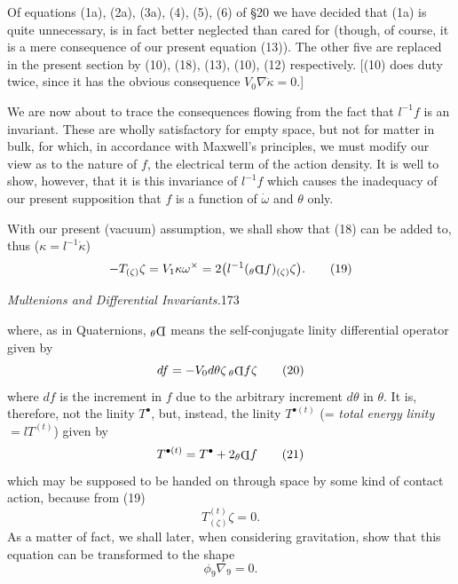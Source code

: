 \documentclass[11pt]{article}
\newcommand{\invd}{\mathord{\vcenter{\hbox{\rotatebox[origin=c]{180}{\(\mathrm{D}\)}}}}}
\newcommand{\thetaPi}{{}_\theta\invd}
\begin{document}
\indent Of equations (1a), (2a), (3a), (4), (5), (6) of §20 we have decided that (1a) is quite unnecessary, is in fact better neglected than cared for (though, of course, it is a mere consequence of our present equation (13)). The other five are replaced in the present section by (10), (18), (13), (10), (12) respectively. [(10) does duty twice, since it has the obvious consequence $V_0\nabla\dot\kappa=0$.]

\indent We are now about to trace the consequences flowing from the fact that $l^{-1}f$ is an invariant. These are wholly satisfactory for empty space, but not for matter in bulk, for which, in accordance with Maxwell's principles, we must modify our view as to the nature of $f$, the electrical term of the action density. It is well to show, however, that it is this invariance of $l^{-1}f$ which causes the inadequacy of our present supposition that $f$ is a function of $\dot\omega$ and $\theta$ only.

\indent With our present (vacuum) assumption, we shall show that (18) can be added to, thus ($\kappa=l^{-1}\dot\kappa$)
\begin{equation}
  -T_{(\zeta)}\zeta=V_1\kappa\omega^\times
  =2\bigl(l^{-1}(\thetaPi f)_{(\zeta)}\zeta\bigr).
  \tag{19}
\end{equation}

\newpage\thispagestyle{empty}\begin{center}\textit{Multenions and Differential Invariants.}\hfill 173\end{center}
where, as in Quaternions, $\thetaPi$ means the self-conjugate linity differential operator given by
\begin{equation}
  df=-V_0d\theta\zeta\,\thetaPi f\zeta
  \tag{20}
\end{equation}
where $df$ is the increment in $f$ due to the arbitrary increment $d\theta$ in $\theta$. It is, therefore, not the linity $T^\bullet$, but, instead, the linity $T^{\bullet(t)}$ (= \emph{total energy linity} $=lT^{(t)}$) given by
\begin{equation}
  T^{\bullet(t)}=T^\bullet+2\thetaPi f
  \tag{21}
\end{equation}
which may be supposed to be handed on through space by some kind of contact action, because from (19)
\begin{equation}
  T_{(\zeta)}^{(t)}\zeta=0.
  \tag{22}
\end{equation}
As a matter of fact, we shall later, when considering gravitation, show that this equation can be transformed to the shape
\[
  \phi_9\nabla_9=0.
\]
\end{document}
